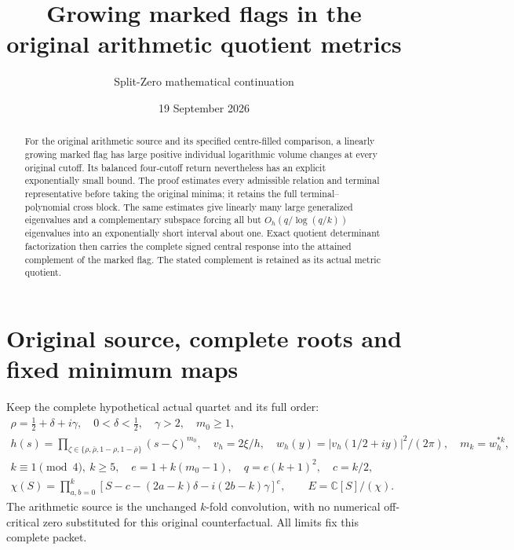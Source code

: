 \documentclass[11pt]{article}
\title{Growing marked flags in the original arithmetic quotient metrics}
\author{Split-Zero mathematical continuation}
\date{19 September 2026}
\newcommand{\C}{\mathbb C}
\begin{document}
\maketitle

\begin{abstract}
For the original arithmetic source and its specified centre-filled
comparison, a linearly growing marked flag has large positive
individual logarithmic volume changes at every original cutoff.
Its balanced four-cutoff return nevertheless has an explicit
exponentially small bound.  The proof estimates every admissible
relation and terminal representative before taking the original
minima; it retains the full terminal--polynomial cross block.
The same estimates give linearly many large generalized
eigenvalues and a complementary subspace forcing all but
\(O_h(q/\log(q/k))\) eigenvalues into an exponentially short
interval about one.  Exact quotient determinant factorization
then carries the complete signed central response into the
attained complement of the marked flag.  The stated complement
is retained as its actual metric quotient.
\end{abstract}

\section{Original source, complete roots and fixed minimum maps}

Keep the complete hypothetical actual quartet and its full order:
\begin{equation}\tag{GMF1}
\begin{gathered}
 \rho=\tfrac12+\delta+i\gamma,\quad
 0<\delta<\tfrac12,\quad \gamma>2,\quad m_0\ge1,\\
 h(s)=\prod_{\zeta\in\{\rho,\bar\rho,1-\rho,1-\bar\rho\}}
                       (s-\zeta)^{m_0},\quad
 v_h=2\xi/h,\quad
 w_h(y)=|v_h(1/2+iy)|^2/(2\pi),\quad m_k=w_h^{*k},\\
 k\equiv1\pmod4,\ k\ge5,\quad
 e=1+k(m_0-1),\quad q=e(k+1)^2,\quad c=k/2,\\
 \chi(S)=\prod_{a,b=0}^k
 [S-c-(2a-k)\delta-i(2b-k)\gamma]^e,\qquad
 E=\C[S]/(\chi).
\end{gathered}
\end{equation}
The arithmetic source is the unchanged \(k\)-fold convolution,
with no numerical off-critical zero substituted for this original
counterfactual.  All limits fix this complete packet.
\end{document}

